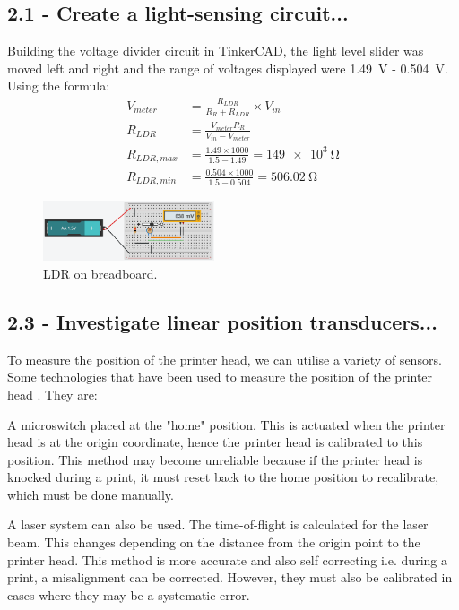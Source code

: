 \documentclass[conference]{IEEEtran}
\begin{document}
\subsection*{2.1 - Create a light-sensing circuit...}
Building the voltage divider circuit in TinkerCAD, the light level slider was moved left and right and the range of voltages displayed were \SI{1.49}{\volt} - \SI{0.504}{\volt}. Using the formula:
\begin{align}
    V_{meter} &= \frac{R_{LDR}}{R_{R} + R_{LDR}} \times V_{in}\\
    R_{LDR} &= \frac{V_{meter}R_{R}}{V_{in} - V_{meter}}\\
    R_{LDR,max} &= \frac{1.49\times 1000}{1.5-1.49} = \SI{149e3}{\ohm}\\
    R_{LDR,min} &= \frac{0.504\times 1000}{1.5 - 0.504} = \SI{506.02}{\ohm}
\end{align}
\begin{figure}[htbp]
    \centerline{\includegraphics[width = 0.45\textwidth]{q2-1BreadBoard.png}}
    \caption{LDR on breadboard.}
\end{figure}
\subsection*{2.3 - Investigate linear position transducers...}
To measure the position of the printer head, we can utilise a variety of sensors. Some technologies that have been used to measure the position of the printer head \cite{b2}. They are:

A microswitch placed at the "home" position. This is actuated when the printer head is at the origin coordinate, hence the printer head is calibrated to this position. This method may become unreliable because if the printer head is knocked during a print, it must reset back to the home position to recalibrate, which must be done manually. 

A laser system can also be used. The time-of-flight is calculated for the laser beam. This changes depending on the distance from the origin point to the printer head. This method is more accurate and also self correcting i.e. during a print, a misalignment can be corrected. However, they must also be calibrated in cases where they may be a systematic error.
\end{document}
